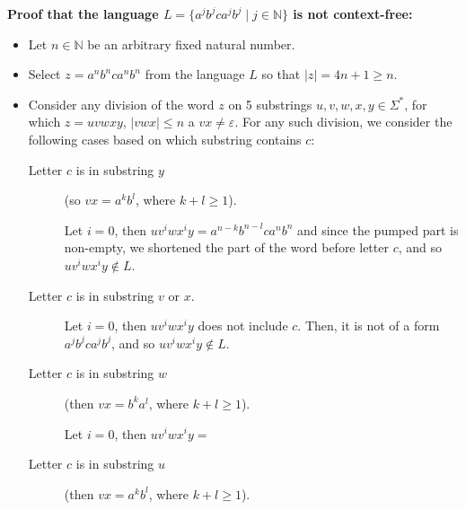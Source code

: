 \documentclass[12pt]{article}
\begin{document}
\textbf{Proof that the language $L = \{ a^jb^jca^jb^j \mid j \in \mathbb{N} \}$ is not context-free:}

\begin{itemize}
    \item Let $n \in \mathbb{N}$ be an arbitrary fixed natural number.
    \item Select $z=a^nb^nca^{n}b^{n}$ from the language $L$ so that $\lvert z \rvert = 4n+1 \geq n$.
    \item Consider any division of the word $z$ on 5 substrings $u, v, w, x, y \in \Sigma^{*}$, for which $z=uvwxy$, $\lvert vwx \rvert \leq n$ a $vx \neq \varepsilon$. For any such division, we consider the following cases based on which substring contains $c$:

    \begin{description}
        \item[Letter $c$ is in substring $y$] (so $vx = a^kb^l$, where $k+l \geq 1$).
        
        Let $i=0$, then $uv^iwx^iy=a^{n-k}b^{n-l}ca^{n}b^{n}$ and since the pumped part is non-empty, we shortened the part of the word before letter $c$, and so $uv^iwx^iy \notin L$.

        \item[Letter $c$ is in substring $v$ or $x$.]
        
        Let $i=0$, then $uv^iwx^iy$ does not include $c$. Then, it is not of a form $a^jb^jca^jb^j$, and so $uv^iwx^iy \notin L$.

        \item[Letter $c$ is in substring $w$] (then $vx = b^ka^l$, where $k+l \geq 1$).
        
        Let $i=0$, then $uv^iwx^iy =$ \vspace{2cm} %

        \item[Letter $c$ is in substring $u$] (then $vx = a^kb^l$, where $k+l \geq 1$).
        

    \end{description}
\end{itemize}
\end{document}
